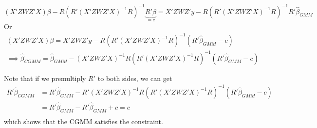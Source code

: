 \documentclass[12pt]{article}
\theoremstyle{definition}
\theoremstyle{property}
\theoremstyle{assumption}
\theoremstyle{example}
\theoremstyle{comment}
\begin{document}
\small{\[
(X'ZWZ'X)\beta-R(R'(X'ZWZ'X)^{-1}R)^{-1}\underbrace{R'\beta}_{=c}=X'ZWZ'y-R(R'(X'ZWZ'X)^{-1}R)^{-1}R'\hat{\beta}_{GMM}
\]}\normalsize
Or
\begin{gather*}
(X'ZWZ'X)\beta=X'ZWZ'y-R(R'(X'ZWZ'X)^{-1}R)^{-1}(R'\hat{\beta}_{GMM}-c)\\
\implies\hat{\beta}_{CGMM}=\hat{\beta}_{GMM}-(X'ZWZ'X)^{-1}R(R'(X'ZWZ'X)^{-1}R)^{-1}(R'\hat{\beta}_{GMM}-c)
\end{gather*}
\par 
Note that if we premultiply $R'$ to both sides, we can get
\[
\begin{aligned}
R'\hat{\beta}_{CGMM}&=R'\hat{\beta}_{GMM}-R'(X'ZWZ'X)^{-1}R(R'(X'ZWZ'X)^{-1}R)^{-1}(R'\hat{\beta}_{GMM}-c)\\
&=R'\hat{\beta}_{GMM}-R'\hat{\beta}_{GMM}+c=c\\
\end{aligned}
\]
which shows that the CGMM satisfies the constraint. 
\end{document}
